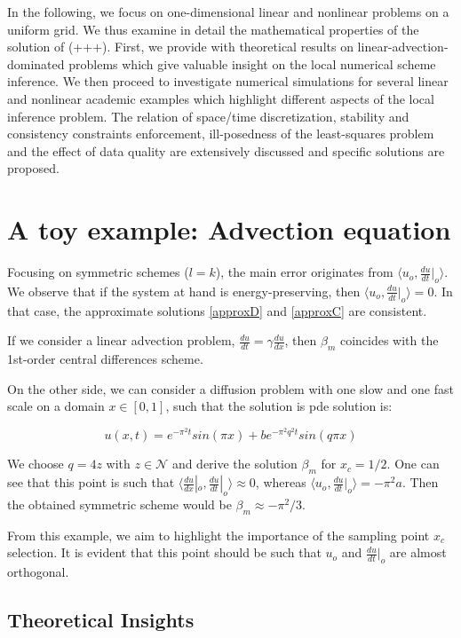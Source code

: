 \documentclass[%
  twocolumn
]{mpi2015-cscpreprint}
\begin{document}
In the following, we focus on one-dimensional linear and nonlinear problems on a uniform grid. We thus examine in detail the mathematical properties of the solution of (+++). First, we provide with theoretical results on linear-advection-dominated problems which give valuable insight on the local numerical scheme inference. We then proceed to investigate numerical simulations for several linear and nonlinear academic examples which highlight different aspects of the local inference problem. The relation of space/time discretization, stability and consistency constraints enforcement, ill-posedness of the least-squares problem and the effect of data quality are extensively discussed and specific solutions are proposed.


\section{A toy example: Advection equation}
Focusing on symmetric schemes ($l=k$), the main error originates from $\langle u_o,\frac{du}{dt}|_o \rangle$. We observe that if the system at hand is energy-preserving, then $\langle u_o,\frac{du}{dt}|_o \rangle=0$. In that case, the approximate solutions \ref{approxD} and \ref{approxC} are consistent. 

If we consider a linear advection problem, $\frac{du}{dt}=\gamma \frac{du}{dx}$, then $\beta_m$ coincides with the 1st-order central differences scheme.

On the other side, we can consider a diffusion problem with one slow and one fast scale on a domain $x \in [0,1]$, such that the solution is pde solution is:

\begin{equation}
    u(x,t)=e^{-\pi^2 t}sin(\pi x) + b e^{-\pi^2 q^2 t} sin (q \pi x)
\end{equation}


We choose $q=4z$ with $z \in \mathcal{N}$ and derive the solution $\beta_m$ for $x_c=1/2$. One can see that this point is such that $\langle \frac{du}{dx}|_o,\frac{du}{dt}|_o \rangle \approx 0$, whereas  $\langle u_o,\frac{du}{dt}|_o \rangle=-\pi^2 a$. Then the obtained symmetric scheme would be $\beta_m \approx -\pi^2/3$.

From this example, we aim to highlight the importance of the sampling point $x_c$ selection. It is evident that this point should be such that $u_o$ and $\frac{du}{dt}|_o$ are almost orthogonal. 
\subsection{Theoretical Insights}
\end{document}
